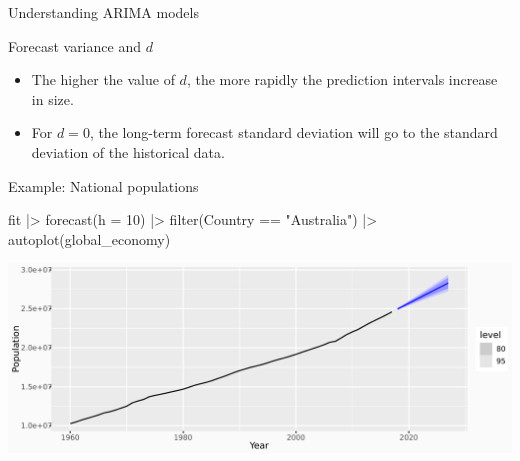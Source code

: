 \documentclass[
  14pt,
  ignorenonframetext,
  aspectratio=169,
]{beamer}
\newenvironment{Shaded}{\begin{snugshade}}{\end{snugshade}}
\newcommand{\AttributeTok}[1]{\textcolor[rgb]{0.77,0.63,0.00}{#1}}
\newcommand{\DecValTok}[1]{\textcolor[rgb]{0.00,0.00,0.81}{#1}}
\newcommand{\FunctionTok}[1]{\textcolor[rgb]{0.00,0.00,0.00}{#1}}
\newcommand{\NormalTok}[1]{\textcolor[rgb]{0.00,0.00,0.00}{#1}}
\newcommand{\SpecialCharTok}[1]{\textcolor[rgb]{0.00,0.00,0.00}{#1}}
\newcommand{\StringTok}[1]{\textcolor[rgb]{0.31,0.60,0.02}{#1}}
\providecommand{\tightlist}{%
  \setlength{\itemsep}{0pt}\setlength{\parskip}{0pt}}\usepackage{longtable,booktabs,array}
\renewenvironment{Shaded}{\vspace*{0.15cm}\color{black}\fontsize{10}{10}\sf\begin{snugshade}\color{black}}{\end{snugshade}}
\begin{document}
\begin{frame}{Understanding ARIMA models}
\protect\hypertarget{understanding-arima-models-1}{}
\fontsize{14}{15.5}\sf

\begin{block}{Forecast variance and \(d\)}
\protect\hypertarget{forecast-variance-and-d}{}
\begin{itemize}
\tightlist
\item
  The higher the value of \(d\), the more rapidly the prediction
  intervals increase in size.
\item
  For \(d=0\), the long-term forecast standard deviation will go to the
  standard deviation of the historical data.
\end{itemize}
\end{block}
\end{frame}

\begin{frame}[fragile]{Example: National populations}
\protect\hypertarget{example-national-populations-2}{}
\fontsize{9}{9}\sf

\begin{Shaded}
\begin{Highlighting}[]
\NormalTok{fit }\SpecialCharTok{|\textgreater{}}
  \FunctionTok{forecast}\NormalTok{(}\AttributeTok{h =} \DecValTok{10}\NormalTok{) }\SpecialCharTok{|\textgreater{}}
  \FunctionTok{filter}\NormalTok{(Country }\SpecialCharTok{==} \StringTok{"Australia"}\NormalTok{) }\SpecialCharTok{|\textgreater{}}
  \FunctionTok{autoplot}\NormalTok{(global\_economy)}
\end{Highlighting}
\end{Shaded}

\includegraphics{04_arima_files/figure-beamer/popfc2-1.pdf}
\end{frame}
\end{document}
